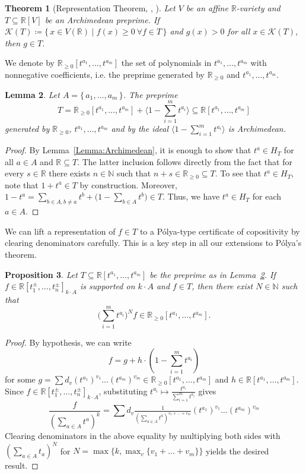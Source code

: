 \documentclass[a4paper,11pt]{amsart}
\newtheorem{theorem}{Theorem}[section]
\newtheorem{proposition}[theorem]{Proposition}
\newtheorem{lemma}[theorem]{Lemma}
\theoremstyle{definition}
\newcommand{\NN}{\mathbb{N}}
\newcommand{\RR}{\mathbb{R}}
\begin{document}
\begin{theorem}[{Representation Theorem, \cite[Th.~5.4.4]{Marshall}, \cite[Cor.~5.3.3]{Scheiderer2024}}]
    \label{Thm:RepThm}
    Let $V$ be an affine $\RR$-variety and $T \subseteq \RR[V]$ be an Archimedean preprime. If $\mathcal{K}(T) \coloneqq \{ \, x \in V(\RR) \mid f(x) \ge 0 \ \forall f \in T  \, \}$ and $g(x)>0$ for all $x \in \mathcal{K}(T)$, then $g \in T$.
\end{theorem}
We denote by $\RR_{\ge 0}[t^{a_1},\ldots,t^{a_m}]$ the set of polynomials in $t^{a_1},\ldots,t^{a_m}$ with nonnegative coefficients, i.e. the preprime generated by $\RR_{\ge 0}$ and $t^{a_1},\ldots,t^{a_m}$.
\begin{lemma}
\label{Lemma:Archimedian}
     Let $A = \{ \, a_1, \dots, a_m \, \}$. The preprime
     \[
     T = \RR_{\geq 0}[t^{a_1},\ldots,t^{a_m}]+\langle 1-\sum_{i=1}^m t^{a_i}\rangle \subseteq \RR[t^{a_1}, \dots , t^{a_m}]
     \]
     generated by $\RR_{\geq0}$, $t^{a_1}, \dots , t^{a_m}$ and by the ideal $\langle 1-\sum_{i=1}^m t^{a_i}\rangle$ 
     is Archimedean.
\end{lemma}
\begin{proof}
    By Lemma~\ref{Lemma:Archimedean}, it is enough to show that $t^a \in H_{T}$ for all $a \in A$ and $\mathbb{R} \subseteq T$. The latter inclusion follows directly from the fact that for every $s \in \mathbb{R}$ there exists $n \in \mathbb{N}$ such that $n + s \in \mathbb{R}_{\geq0} \subseteq T$. To see that  $t^a \in H_{T}$, note that $1+t^a \in T$ by construction. Moreover, $1 - t^a = \sum_{b \in A, b \neq a} t^b + \big( 1 - \sum_{b \in A} t^b \big) \in T$. Thus, we have $t^a \in H_T$ for each $a \in A$.
\end{proof}

We can lift a representation of $f\in T$ to a P\'olya-type certificate of copositivity by clearing denominators carefully. This is a key step in all our extensions to P\'olya's theorem.
\begin{proposition}
    \label{prop:polya}
    Let $T \subseteq \RR[t^{a_1}, \dots , t^{a_m}]$ be the preprime as in Lemma~\ref{Lemma:Archimedian}. If $f \in \RR[t_1^{\pm}, \dots , t_n^{\pm}]_{k\cdot A}$ is supported on $k\cdot A$ and $f \in T$, then there exist $N \in \NN$ such that \[
    \big( \sum_{i=1}^m t^{a_i} \big)^N f \in \RR_{\ge 0}[t^{a_1},\ldots,t^{a_m}].
    \]
\end{proposition}
\begin{proof}
    By hypothesis, we can write 
    \[
        f = g + h \cdot (1-\sum_{i=1}^m t^{a_i})
    \]
    for some $g =  \sum d_v (t^{a_1})^{v_1} \dots (t^{a_m})^{v_m}\in \RR_{\ge 0}[t^{a_1},\ldots,t^{a_m}]$ and $h \in \RR[t^{a_1}, \dots , t^{a_m}]$. Since $f \in \RR[t_1^{\pm}, \dots , t_n^{\pm}]_{k\cdot A}$, substituting $t^{a_i} \mapsto \tfrac{t^{a_i}}{\sum_{i=1}^m t^{a_i}}$ gives 
    \[
        \frac{f}{(\sum_{a \in A} t^a)^k} = \sum d_v \tfrac{1}{ (\sum_{a \in A} t^a)^{v_1+ \dots + v_m}} (t^{a_1})^{v_1} \dots (t^{a_m})^{v_m}
    \]
   Clearing denominators in the above equality by multiplying both sides with $(\sum_{a \in A}t_a)^N$ for $N = \max\{k , \max_{v} \{ v_1 + \dots +v_m\}\}$ yields the desired result.
\end{proof}
\end{document}
